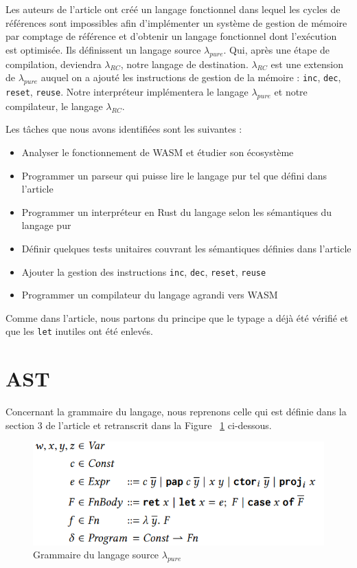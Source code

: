 \documentclass{rapportECL}
\begin{document}
Les auteurs de l'article\cite{ullrich_counting_2020} ont créé un langage fonctionnel dans lequel les cycles de références 
sont impossibles afin d'implémenter un système de gestion de mémoire par comptage de référence et d'obtenir un langage fonctionnel 
dont l'exécution est optimisée. Ils définissent un langage source $\lambda_{pure}$. 
Qui, après une étape de compilation, deviendra $\lambda_{RC}$, notre langage de destination.
$\lambda_{RC}$ est une extension de $\lambda_{pure}$ auquel on a ajouté les instructions de gestion de la mémoire : 
\verb|inc|, \verb|dec|, \verb|reset|, \verb|reuse|.
Notre interpréteur implémentera le langage $\lambda_{pure}$ et notre compilateur, le langage $\lambda_{RC}$.


Les tâches que nous avons identifiées sont les suivantes :

\begin{itemize}
	\item Analyser le fonctionnement de WASM et étudier son écosystème
	\item Programmer un parseur qui puisse lire le langage pur tel que défini dans l'article\cite{ullrich_counting_2020}
	\item Programmer un interpréteur en Rust du langage selon les sémantiques du langage pur
	\item Définir quelques tests unitaires couvrant les sémantiques définies dans l'article
	\item Ajouter la gestion des instructions \verb|inc|, \verb|dec|, \verb|reset|, \verb|reuse|
	\item Programmer un compilateur du langage agrandi vers WASM
\end{itemize}

Comme dans l'article, nous partons du principe que le typage a déjà été vérifié et que les \verb|let| inutiles ont été enlevés.

\section{AST}

Concernant la grammaire du langage, nous reprenons celle qui est définie dans la section 3 de l'article et retranscrit dans la Figure ~\ref{fig:grammaire pure} ci-dessous.

\begin{figure}[hbt!]
	\centering
	\includegraphics[scale=0.80]{logos/grammaire.png}
	\caption{Grammaire du langage source $\lambda_{pure}$}
	\label{fig:grammaire pure}
\end{figure}
\FloatBarrier
\end{document}
